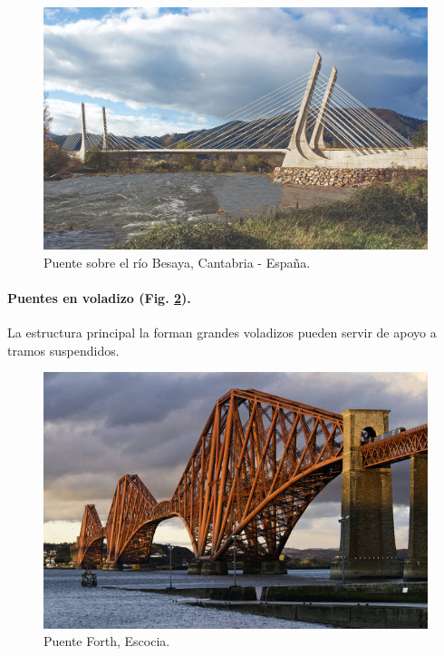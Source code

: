 \begin{figure}[h]
    \centering
    \includegraphics[width=1\linewidth]{Imagenes/Puente sobre el rio Besaya.png}
    \caption{Puente sobre el río Besaya, Cantabria - España.}
    \label{fig:Puente atirantado}
\end{figure}

\paragraph{Puentes en voladizo (Fig. \ref{fig:Puente en voladizo}).}
La estructura principal la forman grandes voladizos pueden servir de apoyo a tramos suspendidos.

\begin{figure}
    \centering
    \includegraphics[width=1\linewidth]{Imagenes/Puente Forth.png}
    \caption{Puente Forth, Escocia.}
    \label{fig:Puente en voladizo}
\end{figure}

